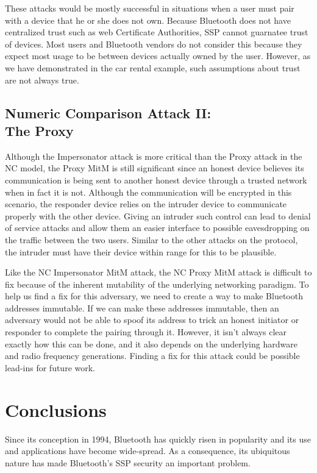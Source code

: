 \documentclass{acm_proc_article-sp}
\begin{document}
These attacks would be mostly successful in situations when a user must pair with a device that he or she does not own. Because Bluetooth does not have centralized trust such as web Certificate Authorities, SSP cannot guarnatee trust of devices. Most users and Bluetooth vendors do not consider this because they expect most usage to be between devices actually owned by the user. However, as we have demonstrated in the car rental example, such assumptions about trust are not always true.

\subsection{Numeric Comparison Attack II:\\The Proxy}
Although the Impersonator attack is more critical than the Proxy attack in the NC model, the Proxy MitM is still significant since an honest device believes its communication is being sent to another honest device through a trusted network when in fact it is not. Although the communication will be encrypted in this scenario, the responder device relies on the intruder device to communicate properly with the other device. Giving an intruder such control can lead to denial of service attacks and allow them an easier interface to possible eavesdropping on the traffic between the two users. Similar to the other attacks on the protocol, the intruder must have their device within range for this to be plausible.

Like the NC Impersonator MitM attack, the NC Proxy MitM attack is difficult to fix because of the inherent mutability of the underlying networking paradigm. To help us find a fix for this adversary, we need to create a way to make Bluetooth addresses immutable. If we can make these addresses immutable, then an adversary would not be able to spoof its address to trick an honest initiator or responder to complete the pairing through it. However, it isn't always clear exactly how this can be done, and it also depends on the underlying hardware and radio frequency generations. Finding a fix for this attack could be possible lead-ins for future work.

\section{Conclusions}

Since its conception in 1994, Bluetooth has quickly risen in popularity and its use and applications have become wide-spread. As a consequence, its ubiquitous nature has made Bluetooth's SSP security an important problem.
\end{document}
